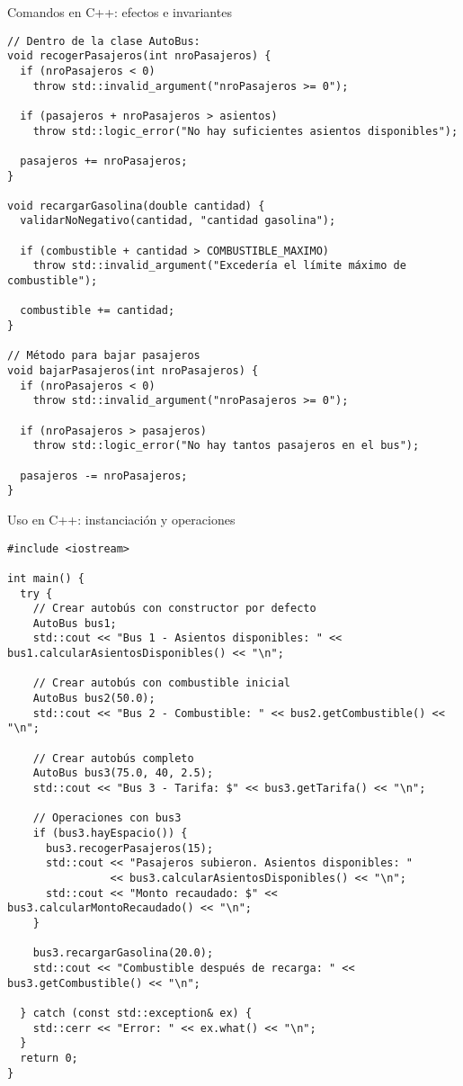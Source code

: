 \documentclass[aspectratio=169]{beamer}
\begin{document}
\begin{frame}[fragile]{Comandos en C++: efectos e invariantes}
\lstset{style=cppstyle}
\begin{lstlisting}
// Dentro de la clase AutoBus:
void recogerPasajeros(int nroPasajeros) {
  if (nroPasajeros < 0) 
    throw std::invalid_argument("nroPasajeros >= 0");
  
  if (pasajeros + nroPasajeros > asientos) 
    throw std::logic_error("No hay suficientes asientos disponibles");
  
  pasajeros += nroPasajeros;
}

void recargarGasolina(double cantidad) {
  validarNoNegativo(cantidad, "cantidad gasolina");
  
  if (combustible + cantidad > COMBUSTIBLE_MAXIMO) 
    throw std::invalid_argument("Excedería el límite máximo de combustible");
  
  combustible += cantidad;
}

// Método para bajar pasajeros
void bajarPasajeros(int nroPasajeros) {
  if (nroPasajeros < 0) 
    throw std::invalid_argument("nroPasajeros >= 0");
  
  if (nroPasajeros > pasajeros) 
    throw std::logic_error("No hay tantos pasajeros en el bus");
  
  pasajeros -= nroPasajeros;
}
\end{lstlisting}
\end{frame}

\begin{frame}[fragile]{Uso en C++: instanciación y operaciones}
\lstset{style=cppstyle}
\begin{lstlisting}
#include <iostream>

int main() {
  try {
    // Crear autobús con constructor por defecto
    AutoBus bus1;
    std::cout << "Bus 1 - Asientos disponibles: " << bus1.calcularAsientosDisponibles() << "\n";
    
    // Crear autobús con combustible inicial
    AutoBus bus2(50.0);
    std::cout << "Bus 2 - Combustible: " << bus2.getCombustible() << "\n";
    
    // Crear autobús completo
    AutoBus bus3(75.0, 40, 2.5);
    std::cout << "Bus 3 - Tarifa: $" << bus3.getTarifa() << "\n";
    
    // Operaciones con bus3
    if (bus3.hayEspacio()) {
      bus3.recogerPasajeros(15);
      std::cout << "Pasajeros subieron. Asientos disponibles: " 
                << bus3.calcularAsientosDisponibles() << "\n";
      std::cout << "Monto recaudado: $" << bus3.calcularMontoRecaudado() << "\n";
    }
    
    bus3.recargarGasolina(20.0);
    std::cout << "Combustible después de recarga: " << bus3.getCombustible() << "\n";
    
  } catch (const std::exception& ex) {
    std::cerr << "Error: " << ex.what() << "\n";
  }
  return 0;
}
\end{lstlisting}
\end{frame}
\end{document}
